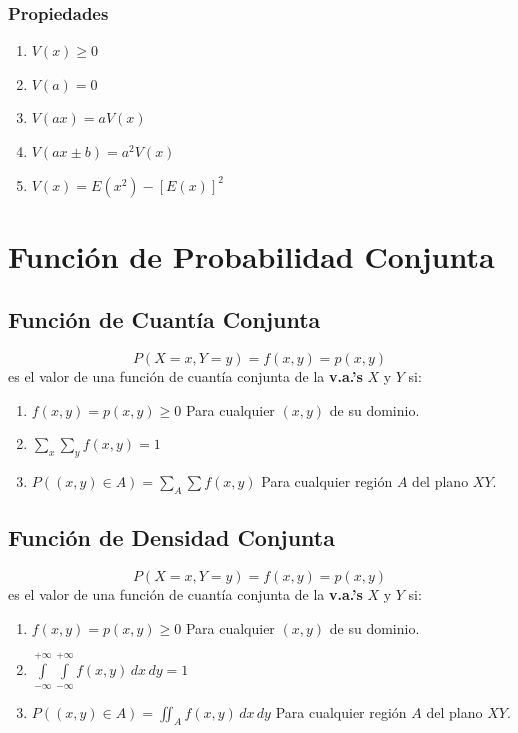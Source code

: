 \subsubsection{Propiedades}
\begin{enumerate}
\item $V(x)\geq 0$
\item $V(a)=0$
\item $V(ax)=aV(x)$
\item $V(ax\pm b)=a^2 V(x)$
\item $V(x)=E(x^2)-[E(x)]^2$
\end{enumerate}
\begin{multicols}{2}
\begin{flushleft}
\end{flushleft}
\columnbreak
\end{multicols}
\section{Función de Probabilidad Conjunta}
\subsection{Función de Cuantía Conjunta}
$$P(X=x,Y=y)=f(x,y)=p(x,y)$$
es el valor de una función de cuantía conjunta de la \textbf{v.a.'s} $X$ y $Y$ si:
\begin{enumerate}[label=(\roman*)]
\item $f(x,y)=p(x,y)\geq 0$ \hspace{2cm} Para cualquier $(x,y)$ de su dominio.
\item $\displaystyle\sum_{x}\displaystyle\sum_{y} f(x,y)=1$
\item $P((x,y)\in A)=\displaystyle\sum _A\displaystyle\sum f(x,y)$ \hspace{2cm} Para cualquier región $A$ del plano $XY$.
\end{enumerate}
\subsection{Función de Densidad Conjunta}
$$P(X=x,Y=y)=f(x,y)=p(x,y)$$
es el valor de una función de cuantía conjunta de la \textbf{v.a.'s} $X$ y $Y$ si:
\begin{enumerate}[label=(\roman*)]
\item $f(x,y)=p(x,y)\geq 0$ \hspace{2cm} Para cualquier $(x,y)$ de su dominio.
\item $\int\limits_{-\infty}^{+\infty} \int\limits_{-\infty}^{+\infty} f(x,y) \,dx \,dy=1$
\item $P((x,y)\in A)=\iint_A f(x,y) \,dx \,dy$ \hspace{2cm} Para cualquier región $A$ del plano $XY$.
\end{enumerate}

